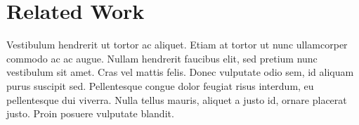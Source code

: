 \section{Related Work}\label{sec:rw}
Vestibulum hendrerit ut tortor ac aliquet.
Etiam at tortor ut nunc ullamcorper commodo ac ac augue.
Nullam hendrerit faucibus elit, sed pretium nunc vestibulum sit amet.
Cras vel mattis felis.
Donec vulputate odio sem, id aliquam purus suscipit sed.
Pellentesque congue dolor feugiat risus interdum, eu pellentesque dui viverra.
Nulla tellus mauris, aliquet a justo id, ornare placerat justo.
Proin posuere vulputate blandit.
